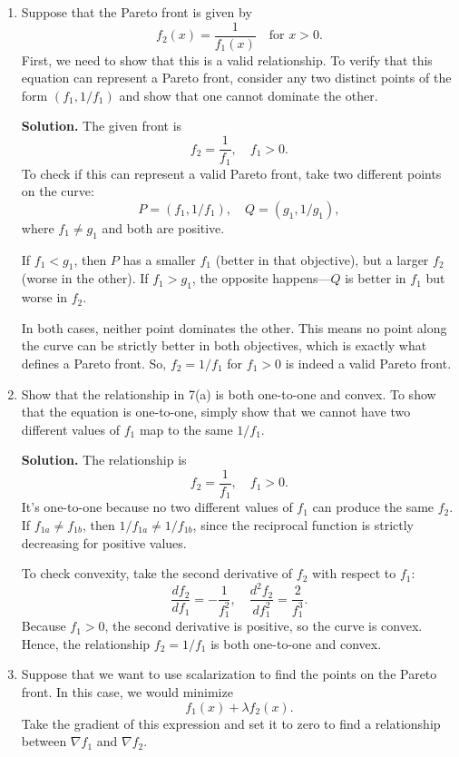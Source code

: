 \documentclass[11pt]{article}
\begin{document}
	\begin{enumerate}[label=\textbf{(\alph*)}, leftmargin=1.2cm]
		\item Suppose that the Pareto front is given by
		\[
		f_2(x) = \frac{1}{f_1(x)} \quad \text{for } x > 0.
		\]
		First, we need to show that this is a valid relationship. To verify that this equation can represent a Pareto front, consider any two distinct points of the form $(f_1, 1/f_1)$ and show that one cannot dominate the other.
		
		\noindent\textbf{Solution.}  
		The given front is 
		\[
		f_2 = \frac{1}{f_1}, \quad f_1 > 0.
		\]
		To check if this can represent a valid Pareto front, take two different points on the curve:
		\[
		P = (f_1, 1/f_1), \quad Q = (g_1, 1/g_1),
		\]
		where \(f_1 \neq g_1\) and both are positive.
		
		If \(f_1 < g_1\), then \(P\) has a smaller \(f_1\) (better in that objective), but a larger \(f_2\) (worse in the other).  
		If \(f_1 > g_1\), the opposite happens—\(Q\) is better in \(f_1\) but worse in \(f_2\).  
		
		In both cases, neither point dominates the other. This means no point along the curve can be strictly better in both objectives, which is exactly what defines a Pareto front.  
		So, \(f_2 = 1/f_1\) for \(f_1 > 0\) is indeed a valid Pareto front.
		
		\item Show that the relationship in 7(a) is both one-to-one and convex. To show that the equation is one-to-one, simply show that we cannot have two different values of $f_1$ map to the same $1/f_1$.
		
		\noindent\textbf{Solution.}  
		The relationship is 
		\[
		f_2 = \frac{1}{f_1}, \quad f_1 > 0.
		\]
		It’s one-to-one because no two different values of \(f_1\) can produce the same \(f_2\).  
		If \(f_{1a} \ne f_{1b}\), then \(1/f_{1a} \ne 1/f_{1b}\), since the reciprocal function is strictly decreasing for positive values.  
		
		To check convexity, take the second derivative of \(f_2\) with respect to \(f_1\):
		\[
		\frac{d f_2}{d f_1} = -\frac{1}{f_1^2}, \quad 
		\frac{d^2 f_2}{d f_1^2} = \frac{2}{f_1^3}.
		\]
		Because \(f_1 > 0\), the second derivative is positive, so the curve is convex.  
		Hence, the relationship \(f_2 = 1/f_1\) is both one-to-one and convex.  
		
		\item Suppose that we want to use scalarization to find the points on the Pareto front. In this case, we would minimize
		\[
		f_1(x) + \lambda f_2(x).
		\]
		Take the gradient of this expression and set it to zero to find a relationship between $\nabla f_1$ and $\nabla f_2$.
		

\end{enumerate}
\end{document}
